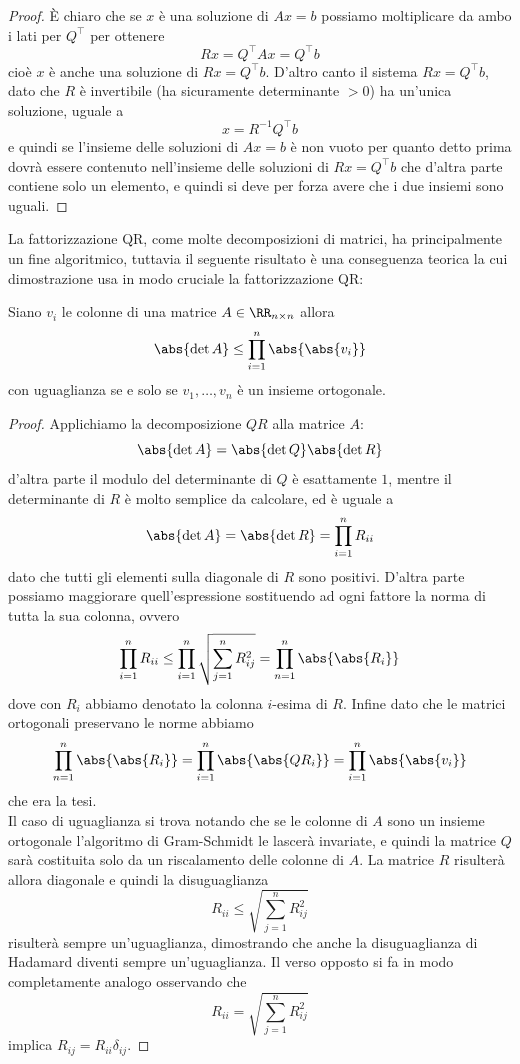 \documentclass[11pt]{scrartcl}
\begin{document}
   	 \begin{proof}
   	 	\`E chiaro che se $x$ è una soluzione di $Ax=b$ possiamo moltiplicare da ambo i lati per $Q^\intercal$ per ottenere
   	 	$$Rx=Q^\intercal A x=Q^\intercal b$$
   	 	cioè $x$ è anche una soluzione di $Rx=Q^\intercal b$. D'altro canto il sistema $Rx=Q^\intercal b$, dato che $R$ è invertibile (ha sicuramente determinante $>0$) ha un'unica soluzione, uguale a
   	 	$$x=R^{-1}Q^\intercal b$$
   	 	e quindi se l'insieme delle soluzioni di $Ax=b$ è non vuoto per quanto detto prima dovrà essere contenuto nell'insieme delle soluzioni di $Rx=Q^\intercal b$ che d'altra parte contiene solo un elemento, e quindi si deve per forza avere che i due insiemi sono uguali.
   	 \end{proof}
   	 La fattorizzazione QR, come molte decomposizioni di matrici, ha principalmente un fine algoritmico, tuttavia il seguente risultato è una conseguenza teorica la cui dimostrazione usa in modo cruciale la fattorizzazione QR:
   	 \begin{theorem}
   	 	Siano $v_i$ le colonne di una matrice $A\in \RR_{n\times n}$ allora 
   	 	$$\abs{\det A}\le \prod_{i=1}^n\abs{\abs{v_i}}$$
   	 	con uguaglianza se e solo se $v_1,\dots,v_n$ è un insieme ortogonale.
   	 \end{theorem}
   	 \begin{proof}
   	 	Applichiamo la decomposizione $QR$ alla matrice $A$:
   	 	$$\abs{\det A}=\abs{\det Q}\abs{\det R}$$
   	 	d'altra parte il modulo del determinante di $Q$ è esattamente $1$, mentre il determinante di $R$ è molto semplice da calcolare, ed è uguale a 
   	 	$$\abs{\det A}=\abs{\det R}=\prod_{i=1}^n R_{ii}$$
   	 	dato che tutti gli elementi sulla diagonale di $R$ sono positivi.
   	 	D'altra parte possiamo maggiorare quell'espressione sostituendo ad ogni fattore la norma di tutta la sua colonna, ovvero
   	 	$$\prod_{i=1}^n R_{ii}\le \prod_{i=1}^n\sqrt{\sum_{j=1}^{n}R^2_{ij}}=\prod_{n=1}^n \abs{\abs{R_i}}$$
   	 	dove con $R_i$ abbiamo denotato la colonna $i$-esima di $R$. Infine dato che le matrici ortogonali preservano le norme abbiamo
   	 	$$\prod_{n=1}^n \abs{\abs{R_i}}=\prod_{i=1}^n \abs{\abs{QR_i}}=\prod_{i=1}^n \abs{\abs{v_i}}$$
   	 	che era la tesi. \\
   	 	Il caso di uguaglianza si trova notando che se le colonne di $A$ sono un insieme ortogonale l'algoritmo di Gram-Schmidt le lascerà invariate, e quindi la matrice $Q$ sarà costituita solo da un riscalamento delle colonne di $A$. La matrice $R$ risulterà allora diagonale e quindi la disuguaglianza
   	 	$$R_{ii}\le \sqrt{\sum_{j=1}^{n}R_{ij}^2}$$
   	 	risulterà sempre un'uguaglianza, dimostrando che anche la disuguaglianza di Hadamard diventi sempre un'uguaglianza. Il verso opposto si fa in modo completamente analogo osservando che
   	 	$$R_{ii}= \sqrt{\sum_{j=1}^{n}R_{ij}^2}$$
   	 	implica $R_{ij}=R_{ii}\delta_{ij}$.
   	 \end{proof}
   	 
\end{document}
